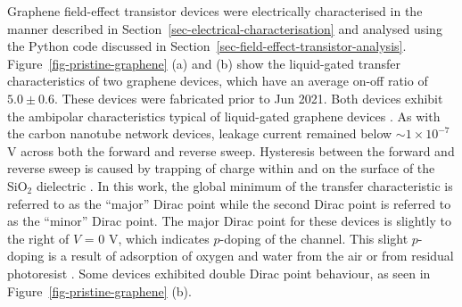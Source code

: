 \documentclass[
  a4paper,
]{scrbook}
\begin{document}
Graphene field-effect transistor devices were electrically characterised
in the manner described in Section~\ref{sec-electrical-characterisation}
and analysed using the Python code discussed in
Section~\ref{sec-field-effect-transistor-analysis}.
Figure~\ref{fig-pristine-graphene} (a) and (b) show the liquid-gated
transfer characteristics of two graphene devices, which have an average
on-off ratio of \(5.0 \pm 0.6\). These devices were fabricated prior to
Jun 2021. Both devices exhibit the ambipolar characteristics typical of
liquid-gated graphene devices
\autocite{Heller2009a,Heller2010,Xia2010,Kireev2017}. As with the carbon
nanotube network devices, leakage current remained below
\(\sim 1 \times 10^{-7}\) V across both the forward and reverse sweep.
Hysteresis between the forward and reverse sweep is caused by trapping
of charge within and on the surface of the SiO\(_{2}\) dielectric
\autocite{Bartolomeo2011}. In this work, the global minimum of the
transfer characteristic is referred to as the ``major'' Dirac point
while the second Dirac point is referred to as the ``minor'' Dirac
point. The major Dirac point for these devices is slightly to the right
of \(V\) = 0 V, which indicates \(p\)-doping of the channel. This slight
\(p\)-doping is a result of adsorption of oxygen and water from the air
or from residual photoresist \autocite{Cheng2011,Shin2012,Kireev2017}.
Some devices exhibited double Dirac point behaviour, as seen in
Figure~\ref{fig-pristine-graphene} (b).
\end{document}
